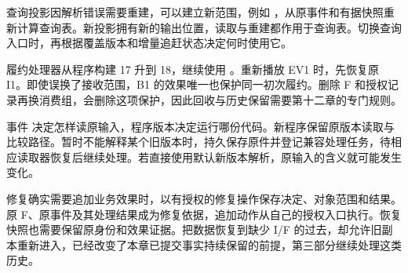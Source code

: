查询投影因解析错误需要重建，可以建立新范围，例如 ，从原事件和有据快照重新计算查询表。新投影拥有新的输出位置，读取与重建都作用于查询表。切换查询入口时，再根据覆盖版本和增量追赶状态决定何时使用它。

履约处理器从程序构建 17 升到 18，继续使用 。重新播放 EV1 时，先恢复原 I1。即使误换了接收范围，B1 的效果唯一也保护同一初次履约。删除 F 和授权记录再换消费组，会删除这项保护，因此回收与历史保留需要第十二章的专门规则。

事件  决定怎样读原输入，程序版本决定运行哪份代码。新程序保留原版本读取与比较路径。暂时不能解释某个旧版本时，持久保存原件并登记兼容处理任务，待相应读取器恢复后继续处理。若直接使用默认新版本解析，原输入的含义就可能发生变化。

修复确实需要追加业务效果时，以有授权的修复操作保存决定、对象范围和结果。原 F、原事件及其处理结果成为修复依据，追加动作从自己的授权入口执行。恢复快照也需要保留原身份和效果证据。把数据恢复到缺少 I/F 的过去，却允许旧副本重新进入，已经改变了本章已提交事实持续保留的前提，第三部分继续处理这类历史。
